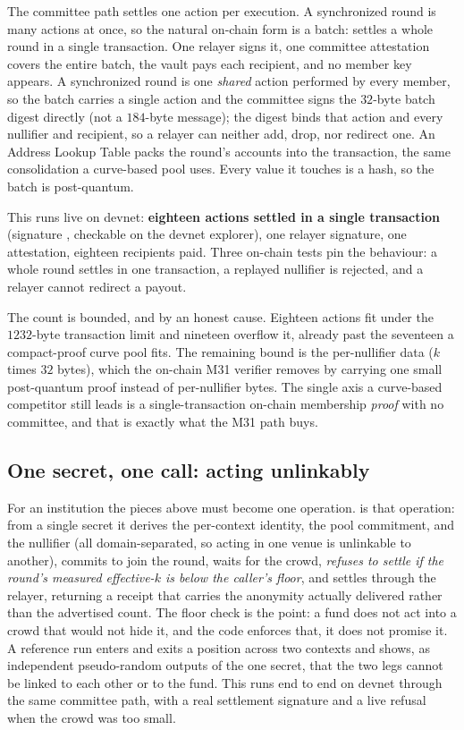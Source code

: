 \documentclass[11pt]{article}
\begin{document}
The committee path settles one action per execution. A synchronized round is many
actions at once, so the natural on-chain form is a batch:  settles a
whole round in a single transaction. One relayer signs it, one committee attestation
covers the entire batch, the vault pays each recipient, and no member key appears. A
synchronized round is one \emph{shared} action performed by every member, so the batch
carries a single action and the committee signs the $32$-byte batch digest directly
(not a $184$-byte message); the digest binds that action and every nullifier and
recipient, so a relayer can neither add, drop, nor redirect one. An Address Lookup Table
packs the round's accounts into the transaction, the same consolidation a curve-based
pool uses. Every value it touches is a hash, so the batch is post-quantum.

This runs live on devnet: \textbf{eighteen actions settled in a single transaction}
(signature , checkable on the devnet explorer), one relayer
signature, one attestation, eighteen recipients paid. Three on-chain tests pin the
behaviour: a whole round settles in one transaction, a replayed nullifier is rejected,
and a relayer cannot redirect a payout.

\begin{honest}
The count is bounded, and by an honest cause. Eighteen actions fit under the
$1232$-byte transaction limit and nineteen overflow it, already past the seventeen a
compact-proof curve pool fits. The remaining bound is the per-nullifier data ($k$ times
$32$ bytes), which the on-chain M31 verifier removes by carrying one small
post-quantum proof instead of per-nullifier bytes. The single axis a curve-based
competitor still leads is a single-transaction on-chain membership \emph{proof} with no
committee, and that is exactly what the M31 path buys.
\end{honest}

\subsection{One secret, one call: acting unlinkably}
\label{sub:act}

For an institution the pieces above must become one operation.  is that
operation: from a single secret it derives the per-context identity, the pool
commitment, and the nullifier (all domain-separated, so acting in one venue is
unlinkable to another), commits to join the round, waits for the crowd, \emph{refuses to
settle if the round's measured effective-$k$ is below the caller's floor}, and settles
through the relayer, returning a receipt that carries the anonymity actually delivered
rather than the advertised count. The floor check is the point: a fund does not act into
a crowd that would not hide it, and the code enforces that, it does not promise it. A
reference run enters and exits a position across two contexts and shows, as independent
pseudo-random outputs of the one secret, that the two legs cannot be linked to each other
or to the fund. This runs end to end on devnet through the same committee path, with a
real settlement signature and a live refusal when the crowd was too small.
\end{document}
